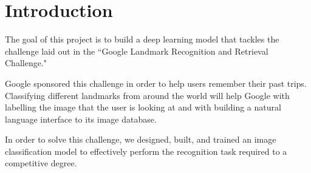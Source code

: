 \section{Introduction}
The goal of this project is to build a deep learning model that tackles the challenge laid out in the ``Google Landmark Recognition and Retrieval Challenge."

Google sponsored this challenge in order to help users remember their past trips. Classifying different landmarks from around the world will help Google with labelling the image that the user is looking at and with building a natural language interface to its image database.

In order to solve this challenge, we designed, built, and trained an image classification model to effectively perform the recognition task required to a competitive degree.
